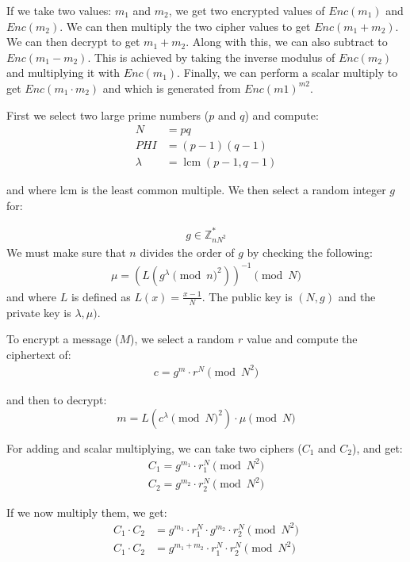 \documentclass[envcountsame,runningheads,notitlepage]{llncs}
\begin{document}
If we take two values: $m_1$ and $m_2$, we get two encrypted values of $Enc(m_1)$ and $Enc(m_2)$. We can then multiply the two cipher values to get $Enc(m_1+m_2)$. We can then decrypt to get $m_1+m_2$. Along with this, we can also subtract to $Enc(m_1-m_2)$. This is achieved by taking the inverse modulus of $Enc(m_2)$ and multiplying it with $Enc(m_1)$. Finally, we can perform a scalar multiply to get $Enc(m_1 \cdot m_2)$ and which is generated from $Enc(m1)^{m2}$. 

First we select two large prime numbers ($p$ and $q$) and compute:
\begin{align}
N&=pq\\
PHI&=(p-1)(q-1)\\
\lambda &=\operatorname {lcm} {(p-1,q-1)} 
\end{align}

and where lcm is the least common multiple. We then select a random integer $g$ for:

\begin{align}
\displaystyle g \in \mathbb {Z} _{nN^{2}}^{*} 
\end{align}
We must make sure that $n$ divides the order of $g$ by checking the following: 
\begin{align}
\mu =(L(g^{\lambda }{\pmod {n}}^{2}))^{-1}{\pmod {N}}
\end{align}
and where $L$ is defined as $L(x)=\frac {x-1}{N}$. The public key is $(N,g)$ and the private key is $\lambda,\mu )$.

To encrypt a message ($M$), we select a random $r$ value and compute the ciphertext of:
\begin{align}
c=g^{m}\cdot r^{N} \pmod {N^{2}}
\end{align}

and then to decrypt:
\begin{equation}
m=L(c^{\lambda }{\pmod N}^{2})\cdot \mu {\pmod N}
\end{equation}

For adding and scalar multiplying, we can take two ciphers ($C_1$ and $C_2$), and get:
\begin{align}
C_1 = g^{m_1}\cdot r_1^{N} \pmod {N^{2}}\\
C_2 = g^{m_2}\cdot r_2^{N} \pmod {N^{2}}
\end{align}

If we now multiply them, we get:
\begin{align}
C_1 \cdot C_2 &= g^{m_1}\cdot r_1^{N} \cdot g^{m_2}\cdot r_2^{N} \pmod {N^{2}}\\
C_1 \cdot C_2 &= g^{m_1+m_2}\cdot r_1^{N} \cdot r_2^{N} \pmod {N^{2}}
\end{align}
\end{document}
